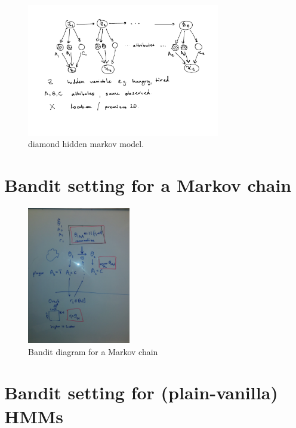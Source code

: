 \documentclass[a4paper,12pt]{article}
\begin{document}
\begin{figure}[!h]
\centering \includegraphics[width=0.75\textwidth]{figs/diahmm} 
\caption{diamond hidden markov model. \label{fig:diahmm}}
\end{figure}


\section{Bandit setting for a Markov chain}

\begin{figure}[!h]
\centering \includegraphics[width=0.4\textwidth]{figs/markov_bandit.png} 
\caption{Bandit diagram for a Markov chain \label{fig:markov}}
\end{figure}


\section{Bandit setting for (plain-vanilla) HMMs}
\end{document}
